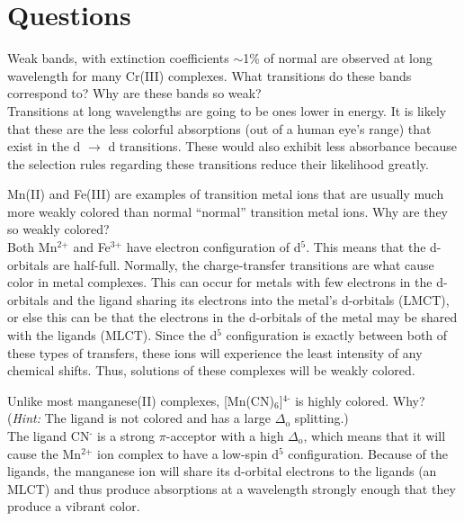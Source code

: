 \documentclass[11pt]{article}
\newcommand{\super}[1]{\ensuremath{^{\textrm{#1}}}}
\newcommand{\sub}[1]{\ensuremath{_{\textrm{#1}}}}
\begin{document}
\section{Questions\cite{lab}}
\begin{enumerate}[A.]
  \begin{item}
    Weak bands, with extinction coefficients $\sim$1\% of normal are observed at long wavelength for many Cr(III) complexes. What transitions do these bands correspond to? Why are these bands so weak? \\

    Transitions at long wavelengths are going to be ones lower in energy. It is likely that these are the less colorful absorptions (out of a human eye's range) that exist in the d $\rightarrow$ d transitions. These would also exhibit less absorbance because the selection rules regarding these transitions reduce their likelihood greatly. \\
  \end{item}

  \begin{item}
    Mn(II) and Fe(III) are examples of transition metal ions that are usually much more weakly colored than normal ``normal'' transition metal ions. Why are they so weakly colored? \\

    Both Mn\super{2+} and Fe\super{3+} have electron configuration of d\super{5}. This means that the d-orbitals are half-full. Normally, the charge-transfer transitions are what cause color in metal complexes. This can occur for metals with few electrons in the d-orbitals and the ligand sharing its electrons into the metal's d-orbitals (LMCT), or else this can be that the electrons in the d-orbitals of the metal may be shared with the ligands (MLCT). Since the d\super{5} configuration is exactly between both of these types of transfers, these ions will experience the least intensity of any chemical shifts. Thus, solutions of these complexes will be weakly colored. \\
  \end{item}

  \begin{item}
    Unlike most manganese(II) complexes, [Mn(CN)\sub{6}]\super{4-} is highly colored. Why? (\textit{Hint:} The ligand is not colored and has a large $\Delta$\sub{o} splitting.) \\

    The ligand CN\super{-} is a strong $\pi$-acceptor with a high $\Delta$\sub{o}, which means that it will cause the Mn\super{2+} ion complex to have a low-spin d\super{5} configuration. Because of the ligands, the manganese ion will share its d-orbital electrons to the ligands (an MLCT) and thus produce absorptions at a wavelength strongly enough that they produce a vibrant color.
  \end{item}
\end{enumerate}


\raggedright




\end{document}
